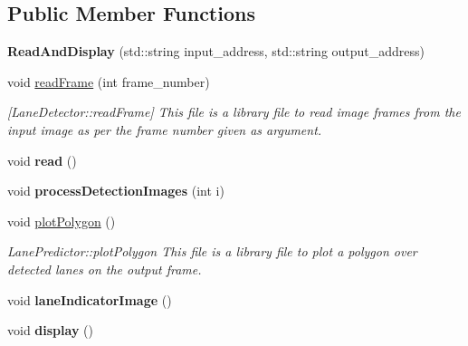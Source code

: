 \subsection*{Public Member Functions}
\begin{DoxyCompactItemize}
\item 
{\bfseries Read\+And\+Display} (std\+::string input\+\_\+address, std\+::string output\+\_\+address)\hypertarget{classReadAndDisplay_abc3248778d9fb58ece40081c8e8a3cec}{}\label{classReadAndDisplay_abc3248778d9fb58ece40081c8e8a3cec}

\item 
void \hyperlink{classReadAndDisplay_a28a35e1606c6d0a80b585dae29d97c47}{read\+Frame} (int frame\+\_\+number)
\begin{DoxyCompactList}\small\item\em \mbox{[}Lane\+Detector\+::read\+Frame\mbox{]} This file is a library file to read image frames from the input image as per the frame number given as argument. \end{DoxyCompactList}\item 
void {\bfseries read} ()\hypertarget{classReadAndDisplay_a5bf23a016ae986bc4982073ecaf5a90a}{}\label{classReadAndDisplay_a5bf23a016ae986bc4982073ecaf5a90a}

\item 
void {\bfseries process\+Detection\+Images} (int i)\hypertarget{classReadAndDisplay_a9b5a7e9757d91b33d233d207b5296e60}{}\label{classReadAndDisplay_a9b5a7e9757d91b33d233d207b5296e60}

\item 
void \hyperlink{classReadAndDisplay_a512c21d08b094441598e43182bb967b0}{plot\+Polygon} ()
\begin{DoxyCompactList}\small\item\em Lane\+Predictor\+::plot\+Polygon This file is a library file to plot a polygon over detected lanes on the output frame. \end{DoxyCompactList}\item 
void {\bfseries lane\+Indicator\+Image} ()\hypertarget{classReadAndDisplay_ac5acb7150f9113e3659189120e050c22}{}\label{classReadAndDisplay_ac5acb7150f9113e3659189120e050c22}

\item 
void {\bfseries display} ()\hypertarget{classReadAndDisplay_a894e5b1a57e3f090ba0f65c7bb0ff86b}{}\label{classReadAndDisplay_a894e5b1a57e3f090ba0f65c7bb0ff86b}

\end{DoxyCompactItemize}
